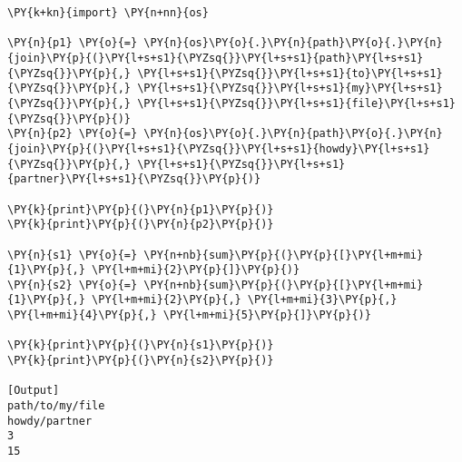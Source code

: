 \begin{Verbatim}[label=\makebox{\url{https://github.com/lucabaldini/cmepda/tree/master/slides/latex/snippets/func\_variadic1.py}},commandchars=\\\{\}]
\PY{k+kn}{import} \PY{n+nn}{os}

\PY{n}{p1} \PY{o}{=} \PY{n}{os}\PY{o}{.}\PY{n}{path}\PY{o}{.}\PY{n}{join}\PY{p}{(}\PY{l+s+s1}{\PYZsq{}}\PY{l+s+s1}{path}\PY{l+s+s1}{\PYZsq{}}\PY{p}{,} \PY{l+s+s1}{\PYZsq{}}\PY{l+s+s1}{to}\PY{l+s+s1}{\PYZsq{}}\PY{p}{,} \PY{l+s+s1}{\PYZsq{}}\PY{l+s+s1}{my}\PY{l+s+s1}{\PYZsq{}}\PY{p}{,} \PY{l+s+s1}{\PYZsq{}}\PY{l+s+s1}{file}\PY{l+s+s1}{\PYZsq{}}\PY{p}{)}
\PY{n}{p2} \PY{o}{=} \PY{n}{os}\PY{o}{.}\PY{n}{path}\PY{o}{.}\PY{n}{join}\PY{p}{(}\PY{l+s+s1}{\PYZsq{}}\PY{l+s+s1}{howdy}\PY{l+s+s1}{\PYZsq{}}\PY{p}{,} \PY{l+s+s1}{\PYZsq{}}\PY{l+s+s1}{partner}\PY{l+s+s1}{\PYZsq{}}\PY{p}{)}

\PY{k}{print}\PY{p}{(}\PY{n}{p1}\PY{p}{)}
\PY{k}{print}\PY{p}{(}\PY{n}{p2}\PY{p}{)}

\PY{n}{s1} \PY{o}{=} \PY{n+nb}{sum}\PY{p}{(}\PY{p}{[}\PY{l+m+mi}{1}\PY{p}{,} \PY{l+m+mi}{2}\PY{p}{]}\PY{p}{)}
\PY{n}{s2} \PY{o}{=} \PY{n+nb}{sum}\PY{p}{(}\PY{p}{[}\PY{l+m+mi}{1}\PY{p}{,} \PY{l+m+mi}{2}\PY{p}{,} \PY{l+m+mi}{3}\PY{p}{,} \PY{l+m+mi}{4}\PY{p}{,} \PY{l+m+mi}{5}\PY{p}{]}\PY{p}{)}

\PY{k}{print}\PY{p}{(}\PY{n}{s1}\PY{p}{)}
\PY{k}{print}\PY{p}{(}\PY{n}{s2}\PY{p}{)}

[Output]
path/to/my/file
howdy/partner
3
15
\end{Verbatim}